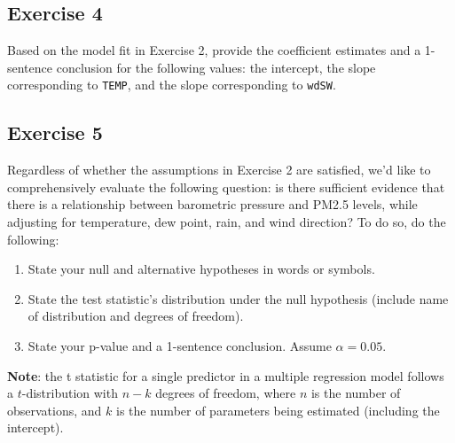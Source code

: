 \documentclass[
  letterpaper,
  DIV=11,
  numbers=noendperiod]{scrartcl}
\begin{document}
\subsection{Exercise 4}\label{exercise-4}

Based on the model fit in Exercise 2, provide the coefficient estimates
and a 1-sentence conclusion for the following values: the intercept, the
slope corresponding to \texttt{TEMP}, and the slope corresponding to
\texttt{wdSW}.

\subsection{Exercise 5}\label{exercise-5}

Regardless of whether the assumptions in Exercise 2 are satisfied, we'd
like to comprehensively evaluate the following question: is there
sufficient evidence that there is a relationship between barometric
pressure and PM2.5 levels, while adjusting for temperature, dew point,
rain, and wind direction? To do so, do the following:

\begin{enumerate}
\def\labelenumi{\alph{enumi}.}
\item
  State your null and alternative hypotheses in words or symbols.
\item
  State the test statistic's distribution under the null hypothesis
  (include name of distribution and degrees of freedom).
\item
  State your p-value and a 1-sentence conclusion. Assume
  \(\alpha = 0.05\).
\end{enumerate}

\begin{tcolorbox}[enhanced jigsaw, arc=.35mm, bottomrule=.15mm, bottomtitle=1mm, breakable, colback=white, colbacktitle=quarto-callout-tip-color!10!white, colframe=quarto-callout-tip-color-frame, coltitle=black, left=2mm, leftrule=.75mm, opacityback=0, opacitybacktitle=0.6, rightrule=.15mm, title=\textcolor{quarto-callout-tip-color}{\faLightbulb}\hspace{0.5em}{Tip}, titlerule=0mm, toprule=.15mm, toptitle=1mm]

\textbf{Note}: the t statistic for a single predictor in a multiple
regression model follows a \(t\)-distribution with \(𝑛−𝑘\) degrees of
freedom, where \(n\) is the number of observations, and \(k\) is the
number of parameters being estimated (including the intercept).

\end{tcolorbox}
\end{document}
